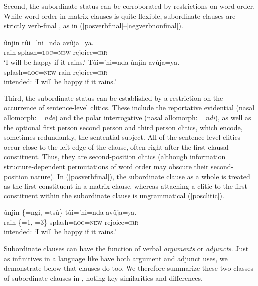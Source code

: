 \documentclass[output=paper,colorlinks,citecolor=brown]{langscibook}
\begin{document}
Second, the subordinate status can be corroborated by restrictions on word order. While word order in matrix clauses is quite flexible, subordinate clauses are strictly verb-final \citep{fischerhengeveld, fischer2011cofan}, as in (\ref{posverbfinal}--\ref{negverbnonfinal}).
\begin{exe}
    \ex \label{posverbfinal}
    \gll {\ob}ûnjin tûi='ni={nda{\cb}} avûja=ya. \\
         rain  splash=\textsc{loc=new} rejoice=\textsc{irr} \\
    \glt `I will be happy if it rains.'
    \ex \label{negverbnonfinal}
    \gll \bad{\ob}Tûi='ni=nda {ûnjin{\cb}} avûja=ya. \\
         splash=\textsc{loc=new} rain  rejoice=\textsc{irr} \\
    \glt intended: `I will be happy if it rains.'
\end{exe}

Third, the subordinate status can be established by a restriction on the occurrence of sentence-level clitics. These include the reportative evidential  (nasal allomorph: \emph{=nde}) and the polar interrogative  (nasal allomorph: \emph{=ndi}), as well as the optional first person  second person  and third person  clitics, which encode, sometimes redundantly, the sentential subject. All of the sentence-level clitics occur close to the left edge of the clause, often right after the first clausal constituent. Thus, they are second-position clitics (although information structure-dependent permutations of word order may obscure their second-position nature). In (\ref{posverbfinal}), the subordinate clause as a whole is treated as the first constituent in a matrix clause, whereas attaching a clitic to the first constituent within the subordinate clause is ungrammatical (\ref{posclitic}).

    \ea \label{posclitic}
    \gll \bad{\ob}ûnjin {\rm\{}=ngi, =tsû{\rm\}} {tûi='ni=nda{\cb}} avûja=ya. \\
         rain {\rm\{}\textsc{=}1, \textsc{=}3{\rm\}}  splash=\textsc{loc=new} rejoice=\textsc{irr} \\
    \glt intended: `I will be happy if it rains.'
    \z 



Subordinate clauses can have the function of verbal \textit{arguments} or \textit{adjuncts}. Just as infinitives in a language like  have both argument and adjunct uses, we demonstrate below that   clauses do too. We therefore summarize these two classes of subordinate clauses in , noting key similarities and differences.
\end{document}
